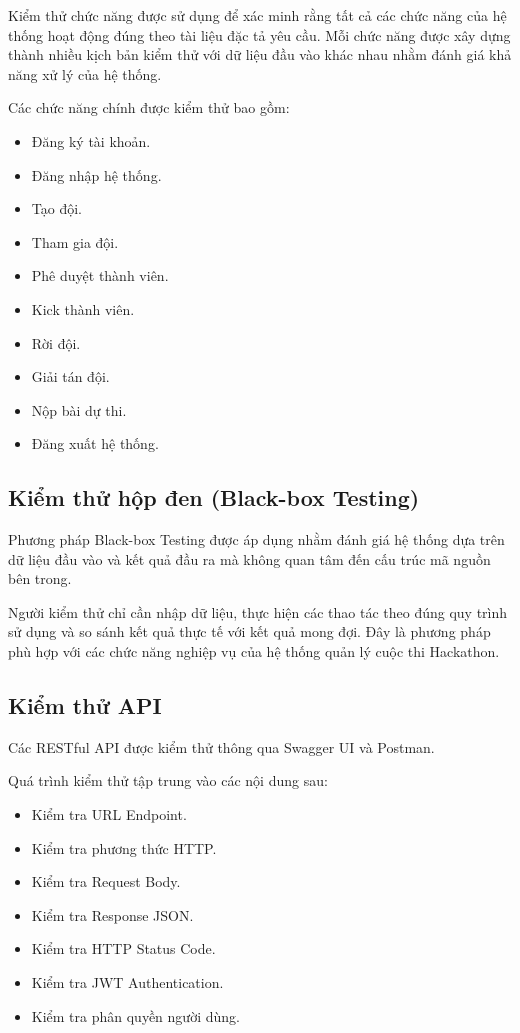 Kiểm thử chức năng được sử dụng để xác minh rằng tất cả các chức năng của hệ thống hoạt động đúng theo tài liệu đặc tả yêu cầu. Mỗi chức năng được xây dựng thành nhiều kịch bản kiểm thử với dữ liệu đầu vào khác nhau nhằm đánh giá khả năng xử lý của hệ thống.

Các chức năng chính được kiểm thử bao gồm:

\begin{itemize}
	\item Đăng ký tài khoản.
	\item Đăng nhập hệ thống.
	\item Tạo đội.
	\item Tham gia đội.
	\item Phê duyệt thành viên.
	\item Kick thành viên.
	\item Rời đội.
	\item Giải tán đội.
	\item Nộp bài dự thi.
	\item Đăng xuất hệ thống.
\end{itemize}


\subsection{Kiểm thử hộp đen (Black-box Testing)}

Phương pháp Black-box Testing được áp dụng nhằm đánh giá hệ thống dựa trên dữ liệu đầu vào và kết quả đầu ra mà không quan tâm đến cấu trúc mã nguồn bên trong.

Người kiểm thử chỉ cần nhập dữ liệu, thực hiện các thao tác theo đúng quy trình sử dụng và so sánh kết quả thực tế với kết quả mong đợi. Đây là phương pháp phù hợp với các chức năng nghiệp vụ của hệ thống quản lý cuộc thi Hackathon.


\subsection{Kiểm thử API}

Các RESTful API được kiểm thử thông qua Swagger UI và Postman.

Quá trình kiểm thử tập trung vào các nội dung sau:

\begin{itemize}
	\item Kiểm tra URL Endpoint.
	\item Kiểm tra phương thức HTTP.
	\item Kiểm tra Request Body.
	\item Kiểm tra Response JSON.
	\item Kiểm tra HTTP Status Code.
	\item Kiểm tra JWT Authentication.
	\item Kiểm tra phân quyền người dùng.
\end{itemize}

